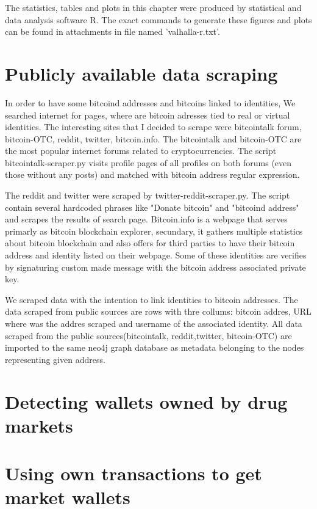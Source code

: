 \documentclass[
  digital, %
  table,   %
  lof,     %
  lot,     %
  oneside
]{fithesis3}
\begin{document}
The statistics, tables and plots in this chapter were produced by statistical and data analysis software R.
The exact commands to generate these figures and plots can be found in attachments in file named 'valhalla-r.txt'.


\section{Publicly available data scraping}
In order to have some bitcoind addresses and bitcoins linked to identities, We searched internet for pages, where are bitcoin adresses tied to real or virtual identities.
The interesting sites that I decided to scrape were bitcointalk forum, bitcoin-OTC, reddit, twitter, bitcoin.info.
The bitcointalk and bitcoin-OTC are the most popular internet forums related to cryptocurrencies. The script bitcointalk-scraper.py visits profile pages of all profiles on both forums (even those without any posts)
 and matched with bitcoin address regular expression.
 
The reddit and twitter were scraped by twitter-reddit-scraper.py. The script contain several hardcoded phrases like "Donate bitcoin" and "bitcoind address" and scrapes the results of search page.
Bitcoin.info is a webpage that serves primarly as bitcoin blockchain explorer, secundary,
it gathers multiple statistics about bitcoin blockchain and also offers for third parties to have their bitcoin address and identity listed on their webpage.
Some of these identities are verifies by signaturing custom made message with the bitcoin address associated private key.

We scraped data with the intention to link identities to bitcoin addresses. The data scraped from public sources are rows with thre collums: bitcoin addres, URL where was the addres scraped and username of the associated identity.
All data scraped from the public sources(bitcointalk, reddit,twitter, bitcoin-OTC) are imported to the same neo4j graph database as metadata belonging to the nodes representing given address.

\section{Detecting wallets owned by drug markets}
\section{Using own transactions to get market wallets}
\end{document}
